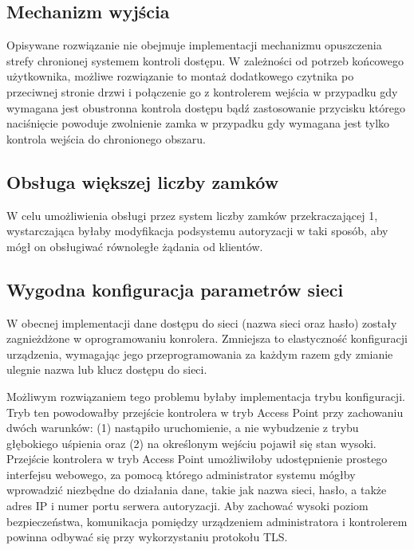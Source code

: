         \subsection{Mechanizm wyjścia}

            Opisywane rozwiązanie nie obejmuje implementacji mechanizmu opuszczenia strefy chronionej systemem kontroli dostępu. W zależności od potrzeb końcowego użytkownika, możliwe rozwiązanie to montaż dodatkowego czytnika po przeciwnej stronie drzwi i połączenie go z kontrolerem wejścia w przypadku gdy wymagana jest obustronna kontrola dostępu bądź zastosowanie przycisku którego naciśnięcie powoduje zwolnienie zamka w przypadku gdy wymagana jest tylko kontrola wejścia do chronionego obszaru.

        \subsection{Obsługa większej liczby zamków}

            W celu umożliwienia obsługi przez system liczby zamków przekraczającej 1, wystarczająca byłaby modyfikacja podsystemu autoryzacji w taki sposób, aby mógł on obsługiwać równoległe żądania od klientów.

        \subsection{Wygodna konfiguracja parametrów sieci}

            W obecnej implementacji dane dostępu do sieci (nazwa sieci oraz hasło) zostały zagnieżdżone w oprogramowaniu konrolera. Zmniejsza to elastyczność konfiguracji urządzenia, wymagając jego przeprogramowania za każdym razem gdy zmianie ulegnie nazwa lub klucz dostępu do sieci.

            Możliwym rozwiązaniem tego problemu byłaby implementacja trybu konfiguracji. Tryb ten powodowałby przejście kontrolera w tryb Access Point przy zachowaniu dwóch warunków: (1) nastąpiło uruchomienie, a nie wybudzenie z trybu głębokiego uśpienia oraz (2) na określonym wejściu pojawił się stan wysoki. Przejście kontrolera w tryb Access Point umożliwiłoby udostępnienie prostego interfejsu webowego, za pomocą którego administrator systemu mógłby wprowadzić niezbędne do działania dane, takie jak nazwa sieci, hasło, a także adres IP i numer portu serwera autoryzacji. Aby zachować wysoki poziom bezpieczeństwa, komunikacja pomiędzy urządzeniem administratora i kontrolerem powinna odbywać się przy wykorzystaniu protokołu TLS.

